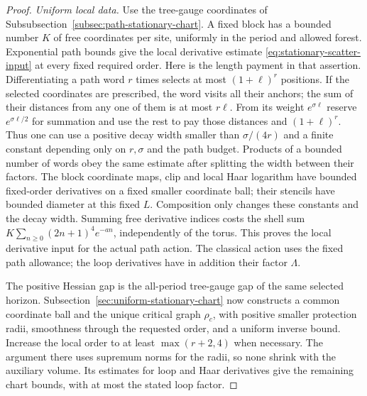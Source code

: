 \begin{proof}
\emph{Uniform local data.} Use the tree-gauge coordinates of
Subsubsection~\ref{subsec:path-stationary-chart}. A fixed block has a bounded
number $K$ of free coordinates per site, uniformly in the period and
allowed forest. Exponential path bounds give the local derivative
estimate \eqref{eq:stationary-scatter-input} at every fixed required
order. Here is the length payment in that assertion. Differentiating
a path word $r$ times selects at most $(1+\ell)^r$ positions. If the
selected coordinates are prescribed, the word visits all their anchors;
the sum of their distances from any one of them is at most $r\ell$.
From its weight $e^{\sigma\ell}$ reserve $e^{\sigma\ell/2}$ for
summation and use the rest to pay those distances and
$(1+\ell)^r$. Thus one can use a positive decay width smaller than
$\sigma/(4r)$ and a finite constant depending only on $r,\sigma$
and the path budget. Products of a bounded number of words obey the
same estimate after splitting the width between their factors.
The block coordinate maps, clip and local Haar logarithm have bounded
fixed-order derivatives on a fixed smaller coordinate ball; their
stencils have bounded diameter at this fixed $L$. Composition only
changes these constants and the decay width. Summing free derivative
indices costs the shell sum $K\sum_{n\ge0}(2n+1)^4e^{-an}$, independently
of the torus. This proves the local derivative input for the actual
path action. The classical action uses the fixed path allowance;
the loop derivatives have in addition their factor $\Lambda$.

The positive Hessian gap is the all-period tree-gauge gap of the same
selected horizon. Subsection~\ref{sec:uniform-stationary-chart} now
constructs a common coordinate ball and the unique critical graph
$\rho_c$, with positive smaller protection radii, smoothness through
the requested order, and a uniform inverse bound. Increase the local
order to at least $\max(r+2,4)$ when necessary. The argument there
uses supremum norms for the radii, so none shrink with the auxiliary
volume. Its estimates for loop and Haar derivatives give the remaining
chart bounds, with at most the stated loop factor.


\end{proof}
